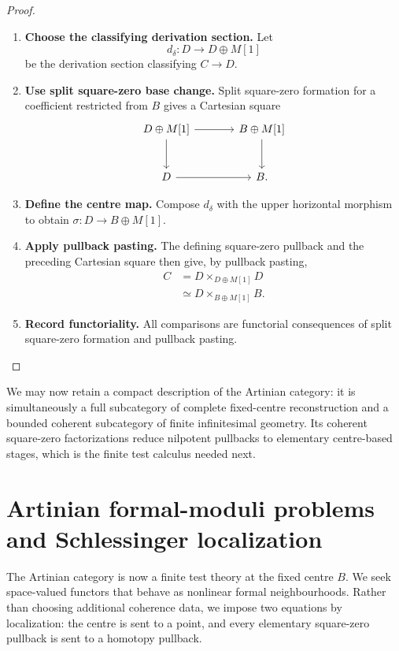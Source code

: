 \begin{proof}
\leavevmode
\begin{enumerate}[label=\textup{(\arabic*)}]
    \item \textbf{Choose the classifying derivation section.}
    Let
    \[
        d_\delta:D\longrightarrow D\oplus M[1]
    \]
    be the derivation section classifying \(C\to D\).
    \item \textbf{Use split square-zero base change.}
    Split square-zero formation
    for a coefficient restricted from \(B\) gives a Cartesian square
    \[
    \begin{tikzcd}[column sep=large,row sep=large]
        D\oplus M[1] \arrow[r] \arrow[d]
            & B\oplus M[1] \arrow[d]
        \\
        D \arrow[r]
            & B.
    \end{tikzcd}
    \]
    \item \textbf{Define the centre map.}
    Compose \(d_\delta\) with the upper horizontal morphism to obtain
    \(\sigma:D\to B\oplus M[1]\).
    \item \textbf{Apply pullback pasting.}
    The defining square-zero pullback and the
    preceding Cartesian square then give, by pullback pasting,
    \[
    \begin{aligned}
        C
        &=D\times_{D\oplus M[1]}D\\
        &\simeq D\times_{B\oplus M[1]}B.
    \end{aligned}
    \]
    \item \textbf{Record functoriality.}
    All comparisons are functorial consequences of split square-zero formation and
    pullback pasting.
\end{enumerate}
\end{proof}


We may now retain a compact description of the Artinian category: it is simultaneously a
full subcategory of complete fixed-centre reconstruction and a bounded coherent
subcategory of finite infinitesimal geometry. Its coherent square-zero factorizations
reduce nilpotent pullbacks to elementary centre-based stages, which is the finite test
calculus needed next.

\section{Artinian formal-moduli problems and Schlessinger localization}
\label{sec:schlessinger-formal-moduli}

The Artinian category is now a finite test theory at the fixed centre \(B\). We seek
space-valued functors that behave as nonlinear formal neighbourhoods. Rather than
choosing additional coherence data, we impose two equations by localization: the centre
is sent to a point, and every elementary square-zero pullback is sent to a homotopy
pullback.

